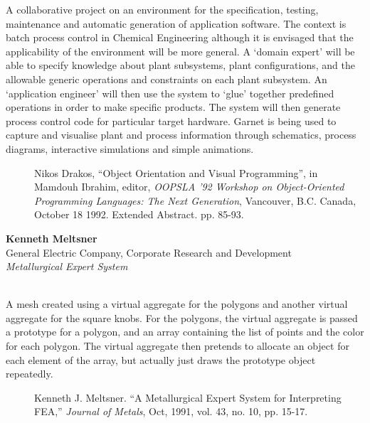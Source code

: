 A collaborative project on an environment for the specification, testing,
maintenance and automatic generation of application software.
The context is batch process control in Chemical Engineering although
it is envisaged that the applicability of the environment will be more general.
A `domain expert' will be able to specify knowledge about plant
subsystems, plant configurations, and the allowable generic operations and
constraints on each plant subsystem. An `application engineer' will then use
the system to `glue' together predefined operations in order to make specific
products. The system will then generate process control code for particular
target hardware. Garnet is being used to capture and visualise plant and
process information through schematics, process diagrams, interactive
simulations and simple animations.
\begin{description}
\item[] Nikos Drakos, ``Object Orientation and Visual Programming'', in
Mamdouh Ibrahim, editor, {\it OOPSLA '92 Workshop on Object-Oriented
Programming Languages: The Next Generation}, Vancouver, B.C.
Canada, October 18 1992. Extended Abstract. pp. 85-93.
\end{description}



\newpage{}

\begin{center}
\end{center}
\begin{tabular}
{\bf Kenneth Meltsner}\\
General Electric Company, Corporate Research and Development\\
{\it Metallurgical Expert System}\\
\\
\end{tabular}
A mesh created using a virtual aggregate for the
polygons and another virtual aggregate for the square knobs.  For the
polygons, the virtual aggregate is passed a prototype for a
polygon, and an array containing the list of points and the color for
each polygon.   The virtual aggregate then pretends to
allocate an object for each element of the array, but actually just
draws the prototype object repeatedly.

\begin{description}
\item[] Kenneth J. Meltsner.
``A Metallurgical Expert System for Interpreting FEA,'' {\it Journal of Metals},
Oct, 1991, vol. 43, no. 10, pp. 15-17.
\end{description}

